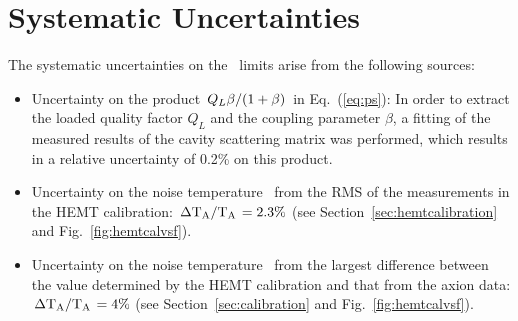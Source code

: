 \section{Systematic Uncertainties} \label{sec:sys}
The systematic uncertainties on the \gagg\ limits arise from the 
following sources:
\begin{itemize}
\item Uncertainty on the product 
$\left.Q_L\beta\middle/\left(1+\beta\right)\right.$ in Eq.~(\ref{eq:ps}): 
In order to extract the loaded quality factor $Q_L$ and the coupling parameter 
$\beta$, a fitting of the measured results of the cavity scattering matrix 
was performed, which results in a relative uncertainty of 0.2\% on this 
product. 

\item Uncertainty on the noise temperature \ta\ from the RMS of 
the measurements in the HEMT calibration: 
$\left. \Delta \text{T}_\text{A}\middle/\text{T}_\text{A}\right.= 2.3\%$ 
(see Section~\ref{sec:hemtcalibration} and Fig.~\ref{fig:hemtcalvsf}).

\item Uncertainty on the noise temperature \ta\ from the largest difference 
between the value determined by the HEMT calibration and that from the axion 
data: $\left. \Delta \text{T}_\text{A}\middle/\text{T}_\text{A}\right.= 4\%$ 
(see Section~\ref{sec:calibration} and Fig.~\ref{fig:hemtcalvsf}). 


\end{itemize}
